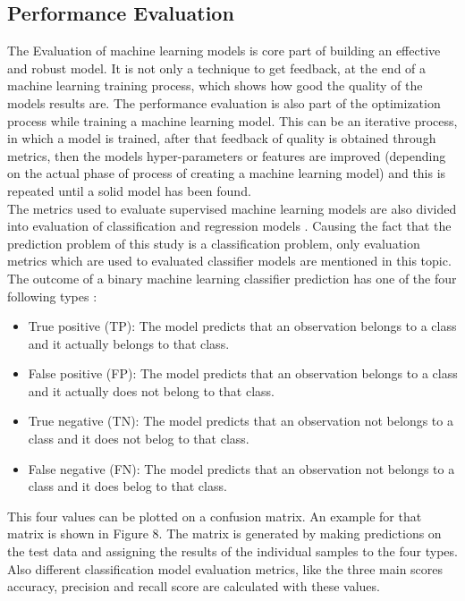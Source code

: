 \documentclass[../masterarbeit.tex]{subfiles}
\begin{document}
	



\subsection{Performance Evaluation}
The Evaluation of machine learning models is core part of building an effective and robust model. It is not only a technique to get feedback, at the end of a machine learning training process, which shows how good the quality of the models results are. The performance evaluation is also part of the optimization process while training a machine learning model. This can be an iterative process, in which a model is trained, after that feedback of quality is obtained through metrics, then the models hyper-parameters or features are improved (depending on the actual phase of process of creating a machine learning model) and this is repeated until a solid model has been found. \autocite[]{analyticsvidhya_evaluation:2022} \\
The metrics used to evaluate supervised machine learning models are also divided into evaluation of classification and regression models \textcite[]{jeremyjordan_evaluation:2022}. Causing the fact that the prediction problem of this study is a classification problem, only evaluation metrics which are used to evaluated classifier models are mentioned in this topic. \\
The outcome of a binary machine learning classifier prediction has one of the four following types \textcite[]{jeremyjordan_evaluation:2022}:
\begin{itemize}
	\item True positive (TP): The model predicts that an observation belongs to a class and it actually belongs to that class.
	\item False positive (FP): The model predicts that an observation belongs to a class and it actually does not belong to that class.
	\item True negative (TN): The model predicts that an observation not belongs to a class and it does not belog to that class.
	\item False negative (FN): The model predicts that an observation not belongs to a class and it does belog to that class.
\end{itemize} 
This four values can be plotted on a confusion matrix. An example for that matrix is shown in Figure 8. The matrix is generated by making predictions on the test data and assigning the results of the individual samples to the four types. Also different classification model evaluation metrics, like the three main scores accuracy, precision and recall score are calculated with these values. \autocite[]{jeremyjordan_evaluation:2022}
\end{document}
